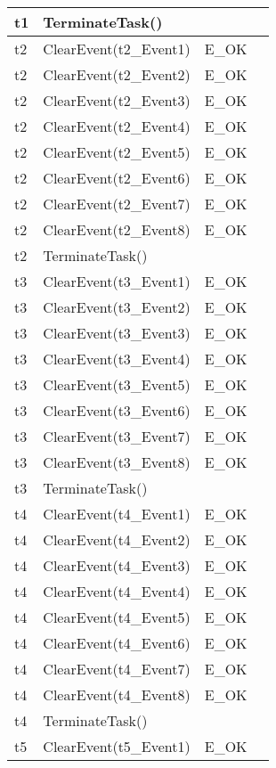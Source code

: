 \documentclass[10pt]{article}
\newlength{\Li}\settowidth{\Li}{Running}
\newlength{\Lii}\setlength{\Lii}{7cm}
\newlength{\Liiii}\setlength{\Liiii}{0.9cm}
\newlength{\Liii}\setlength{\Liii}{\textwidth} \addtolength{\Liii}{-\Li} \addtolength{\Liii}{-\Lii} \addtolength{\Liii}{-\Liiii}
\begin{document}
\begin{supertabular}{|p{\Li}|p{\Lii}|p{\Liii}|p{\Liiii}|}
	t1	& TerminateTask()				&					&  \\ \hline
	t2	& ClearEvent(t2\_Event1)		& E\_OK				& \\ \hline 
	t2	& ClearEvent(t2\_Event2)		& E\_OK				& \\ \hline 
	t2	& ClearEvent(t2\_Event3)		& E\_OK				& \\ \hline 
	t2	& ClearEvent(t2\_Event4)		& E\_OK				& \\ \hline 
	t2	& ClearEvent(t2\_Event5)		& E\_OK				& \\ \hline 
	t2	& ClearEvent(t2\_Event6)		& E\_OK				& \\ \hline 
	t2	& ClearEvent(t2\_Event7)		& E\_OK				& \\ \hline 
	t2	& ClearEvent(t2\_Event8)		& E\_OK				& \\ \hline 
	t2	& TerminateTask()				&					&  \\ \hline
	t3	& ClearEvent(t3\_Event1)		& E\_OK				& \\ \hline 
	t3	& ClearEvent(t3\_Event2)		& E\_OK				& \\ \hline 
	t3	& ClearEvent(t3\_Event3)		& E\_OK				& \\ \hline 
	t3	& ClearEvent(t3\_Event4)		& E\_OK				& \\ \hline 
	t3	& ClearEvent(t3\_Event5)		& E\_OK				& \\ \hline 
	t3	& ClearEvent(t3\_Event6)		& E\_OK				& \\ \hline 
	t3	& ClearEvent(t3\_Event7)		& E\_OK				& \\ \hline 
	t3	& ClearEvent(t3\_Event8)		& E\_OK				& \\ \hline 
	t3	& TerminateTask()				&					&  \\ \hline
	t4	& ClearEvent(t4\_Event1)		& E\_OK				& \\ \hline 
	t4	& ClearEvent(t4\_Event2)		& E\_OK				& \\ \hline 
	t4	& ClearEvent(t4\_Event3)		& E\_OK				& \\ \hline 
	t4	& ClearEvent(t4\_Event4)		& E\_OK				& \\ \hline 
	t4	& ClearEvent(t4\_Event5)		& E\_OK				& \\ \hline 
	t4	& ClearEvent(t4\_Event6)		& E\_OK				& \\ \hline 
	t4	& ClearEvent(t4\_Event7)		& E\_OK				& \\ \hline 
	t4	& ClearEvent(t4\_Event8)		& E\_OK				& \\ \hline 
	t4	& TerminateTask()				&					&  \\ \hline
	t5	& ClearEvent(t5\_Event1)		& E\_OK				& \\ \hline 

\end{supertabular}
\end{document}
